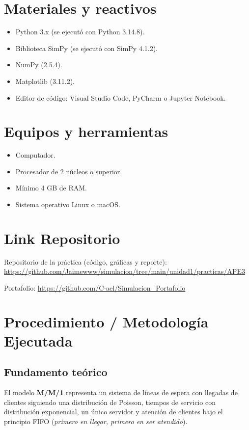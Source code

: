 \documentclass[11pt,a4paper]{article}
\begin{document}
\section{Materiales y reactivos}
\begin{itemize}
    \item Python 3.x (se ejecutó con Python 3.14.8).
    \item Biblioteca SimPy (se ejecutó con SimPy 4.1.2).
    \item NumPy (2.5.4).
    \item Matplotlib (3.11.2).
    \item Editor de código: Visual Studio Code, PyCharm o Jupyter Notebook.
\end{itemize}

\section{Equipos y herramientas}
\begin{itemize}
    \item Computador.
    \item Procesador de 2 núcleos o superior.
    \item Mínimo 4 GB de RAM.
    \item Sistema operativo Linux o macOS.
\end{itemize}

\section{Link Repositorio}
Repositorio de la práctica (código, gráficas y reporte): \\
\url{https://github.com/Jaimewww/simulacion/tree/main/unidad1/practicas/APE3}

\noindent Portafolio: \url{https://github.com/C-ael/Simulacion_Portafolio}

\section{Procedimiento / Metodología Ejecutada}

\subsection{Fundamento teórico}

El modelo \textbf{M/M/1} representa un sistema de líneas de espera con llegadas de
clientes siguiendo una distribución de Poisson, tiempos de servicio con distribución
exponencial, un único servidor y atención de clientes bajo el principio FIFO
(\emph{primero en llegar, primero en ser atendido}).
\end{document}
